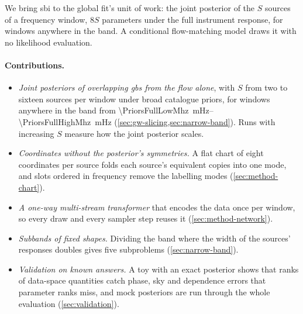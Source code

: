 We bring \acs{sbi} to the global fit's unit of work: the joint posterior of the $S$
sources of a frequency window, $8S$ parameters under the full instrument response, for windows
anywhere in the band. A conditional flow-matching model
\citep{lipman2023flow,liu2023flow,albergo2023building,dax2023flow} draws it with no likelihood
evaluation.

\paragraph{Contributions.}
\begin{itemize}
  \item \emph{Joint posteriors of overlapping \acp{gb} from the flow alone}, with $S$ from two to
    sixteen sources per window under broad catalogue priors, for windows anywhere in the band
    from \qtyrange{\PriorsFullLowMhz}{\PriorsFullHighMhz}{\milli\hertz}
    (\cref{sec:gw-slicing,sec:narrow-band}). Runs with increasing $S$ measure how the joint
    posterior scales.
  \item \emph{Coordinates without the posterior's symmetries.} A flat chart of eight coordinates
    per source folds each source's equivalent copies into one mode, and slots ordered in frequency
    remove the labelling modes (\cref{sec:method-chart}).
  \item \emph{A one-way multi-stream transformer} that encodes the data once per window, so every
    draw and every sampler step reuses it (\cref{sec:method-network}).
  \item \emph{Subbands of fixed shapes.} Dividing the band where the width of the sources'
    responses doubles gives five subproblems (\cref{sec:narrow-band}).
  \item \emph{Validation on known answers.} A toy with an exact posterior shows that ranks of
    data-space quantities catch phase, sky and dependence errors that parameter ranks miss, and
    mock posteriors are run through the whole evaluation (\cref{sec:validation}).
\end{itemize}

